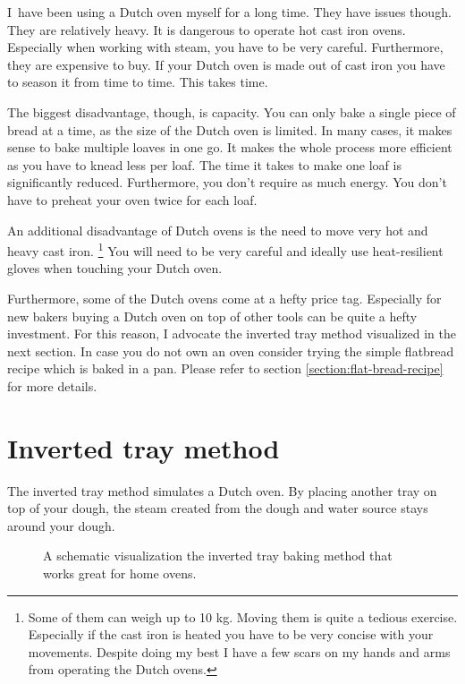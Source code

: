 I~have been using a Dutch oven myself for a long time. They
have issues though. They are relatively heavy. It is dangerous
to operate hot cast iron ovens. Especially when working with steam,
you have to be very careful. Furthermore,
they are expensive to buy. If your Dutch oven is made out
of cast iron you have to season it from time to time. This takes
time.

The biggest disadvantage, though, is
capacity. You can only bake a single piece of bread at a time,
as the size of the Dutch oven is limited.
In many cases, it makes sense to bake multiple
loaves in one go. It makes the whole process more
efficient as you have to knead less per loaf. The time it
takes to make one loaf is significantly reduced. Furthermore,
you don't require as much energy. You don't have
to preheat your oven twice for each loaf.

An additional disadvantage of Dutch ovens is the
need to move very hot and heavy cast iron. \footnote{
  Some of them can weigh up to 10 kg. Moving them is quite
  a tedious exercise. Especially if the cast iron is
  heated you have to be very concise with your movements.
  Despite doing my best I have a few scars on my
  hands and arms from operating the Dutch ovens.
} You will need to be very careful and ideally use
heat-resilient gloves when touching your Dutch oven.

Furthermore, some of the Dutch ovens come at a hefty
price tag. Especially for new bakers buying a Dutch oven on
top of other tools can be quite a hefty investment. For
this reason, I advocate the inverted tray method visualized
in the next section. In case you do not own an oven consider trying
the simple flatbread recipe which is baked in a pan. Please
refer to section \ref{section:flat-bread-recipe} for more details.


\section{Inverted tray method}

The inverted tray method simulates a Dutch oven.
By placing another tray on top of your dough, the steam
created from the dough and water source stays
around your dough.

\begin{figure}[!htb]
\begin{center}
  
  \caption[Inverted tray baking process]{A schematic visualization the
  inverted tray baking method that works great for home ovens.}%
  \label{fig:inverted-tray-process}
\end{center}
\end{figure}



